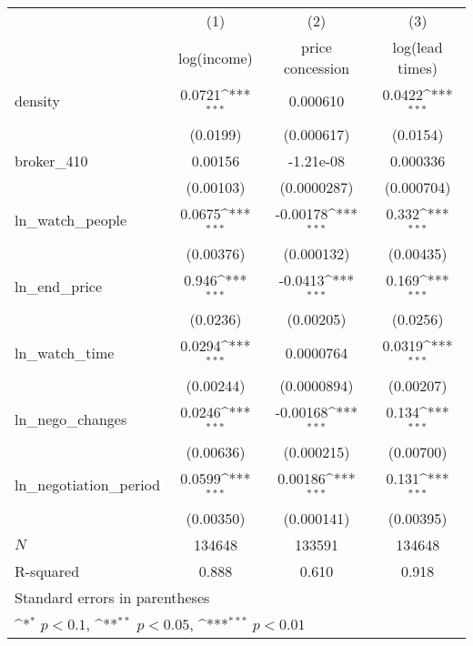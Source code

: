 {
\def\sym#1{\ifmmode^{#1}\else\(^{#1}\)\fi}
\begin{tabular}{l*{3}{c}}
\toprule
            &\multicolumn{1}{c}{(1)}&\multicolumn{1}{c}{(2)}&\multicolumn{1}{c}{(3)}\\
            &\multicolumn{1}{c}{log(income)}&\multicolumn{1}{c}{price concession}&\multicolumn{1}{c}{log(lead times)}\\
\midrule
density     &      0.0721\sym{***}&    0.000610         &      0.0422\sym{***}\\
            &    (0.0199)         &  (0.000617)         &    (0.0154)         \\
\addlinespace
broker\_410  &     0.00156         &   -1.21e-08         &    0.000336         \\
            &   (0.00103)         & (0.0000287)         &  (0.000704)         \\
\addlinespace
ln\_watch\_people&      0.0675\sym{***}&    -0.00178\sym{***}&       0.332\sym{***}\\
            &   (0.00376)         &  (0.000132)         &   (0.00435)         \\
\addlinespace
ln\_end\_price&       0.946\sym{***}&     -0.0413\sym{***}&       0.169\sym{***}\\
            &    (0.0236)         &   (0.00205)         &    (0.0256)         \\
\addlinespace
ln\_watch\_time&      0.0294\sym{***}&   0.0000764         &      0.0319\sym{***}\\
            &   (0.00244)         & (0.0000894)         &   (0.00207)         \\
\addlinespace
ln\_nego\_changes&      0.0246\sym{***}&    -0.00168\sym{***}&       0.134\sym{***}\\
            &   (0.00636)         &  (0.000215)         &   (0.00700)         \\
\addlinespace
ln\_negotiation\_period&      0.0599\sym{***}&     0.00186\sym{***}&       0.131\sym{***}\\
            &   (0.00350)         &  (0.000141)         &   (0.00395)         \\
\midrule
\(N\)       &      134648         &      133591         &      134648         \\
R-squared   &       0.888         &       0.610         &       0.918         \\
\bottomrule
\multicolumn{4}{l}{\footnotesize Standard errors in parentheses}\\
\multicolumn{4}{l}{\footnotesize \sym{*} \(p<0.1\), \sym{**} \(p<0.05\), \sym{***} \(p<0.01\)}\\
\end{tabular}
}
